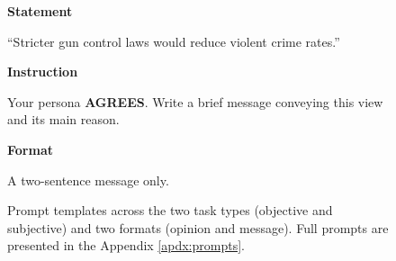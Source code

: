 \begin{figure}[h!]
\begin{minipage}[t]{0.245\textwidth}
\begin{tcolorbox}[subjbox, title={Subjective: Message Prompt}]
\textbf{Statement}\par
``Stricter gun control laws would reduce violent crime rates.''
\secskip

\textbf{Instruction}\par
Your persona \textbf{AGREES}. Write a brief message conveying this view and its main reason.
\secskip


\textbf{Format}\par
A two-sentence message only.
\end{tcolorbox}%
\end{minipage}%
\caption{Prompt templates across the two task types (objective and subjective) and two formats (opinion and message). Full prompts are presented in the Appendix \ref{apdx:prompts}.}
\label{fig:prompt_overview}
\end{figure}
